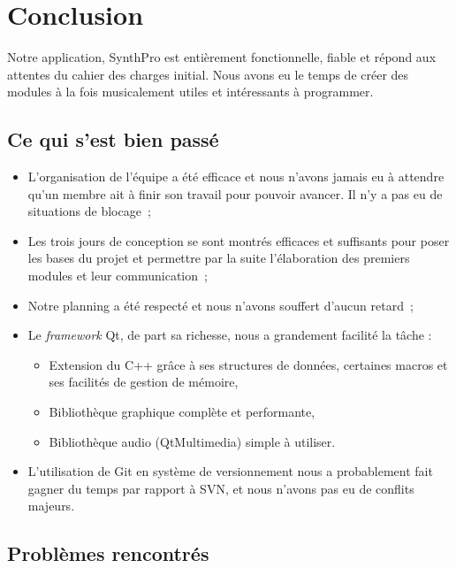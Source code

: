 \section{Conclusion}

Notre application, SynthPro est entièrement fonctionnelle, fiable
et répond aux attentes du cahier des charges initial. Nous avons eu
le temps de créer des modules à la fois musicalement utiles et
intéressants à programmer.

\subsection{Ce qui s'est bien passé}

\begin{itemize}
\item
  L'organisation de l'équipe a été efficace et nous n'avons jamais eu
  à attendre qu'un membre ait à finir son travail pour pouvoir
  avancer. Il n'y a pas eu de situations de blocage~;
\item
  Les trois jours de conception se sont montrés efficaces et
  suffisants pour poser les bases du projet et permettre par la suite
  l'élaboration des premiers modules et leur communication~;
\item
  Notre planning a été respecté et nous n'avons souffert d'aucun
  retard~;
\item
  Le \emph{framework} Qt, de part sa richesse, nous a grandement
  facilité la tâche :
  \begin{itemize}
  \item
    Extension du C++ grâce à ses structures de données, certaines
    macros et ses facilités de gestion de mémoire,
  \item
    Bibliothèque graphique complète et performante,
  \item
    Bibliothèque audio (QtMultimedia) simple à utiliser.
  \end{itemize}
\item
  L'utilisation de Git en système de versionnement nous a
  probablement fait gagner du temps par rapport à SVN, et nous
  n'avons pas eu de conflits majeurs.
\end{itemize}

\subsection{Problèmes rencontrés}

